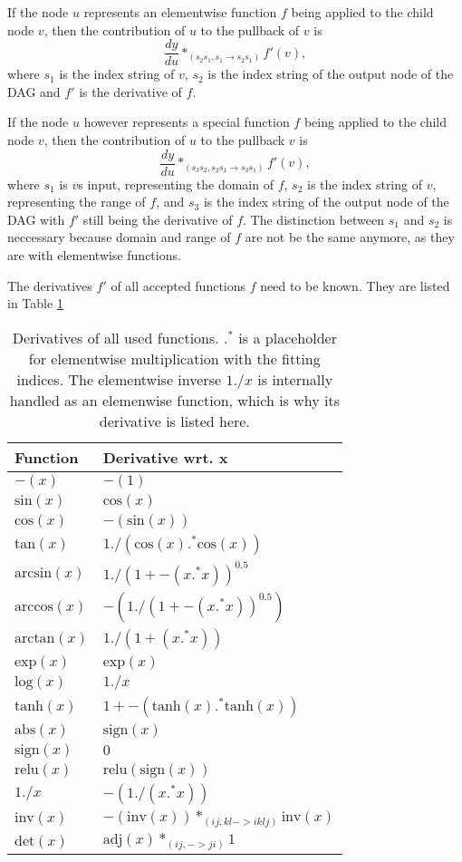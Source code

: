 \documentclass[12pt, a4paper]{report}
\begin{document}
If the node $u$ represents an elementwise function $f$ being applied to the child node $v$, then the contribution of $u$ to the pullback of $v$ is 
$$
\frac{dy}{du} *_{(s_2s_1,s_1 \rightarrow s_2s_1)} f'(v),
$$
where $s_1$ is the index string of $v$, $s_2$ is the index string of the output node of the DAG and $f'$ is the derivative of $f$.

If the node $u$ however represents a special function $f$ being applied to the child node $v$, then the contribution of $u$ to the pullback $v$ is
$$
\frac{dy}{du} *_{(s_3s_2,s_2s_1 \rightarrow s_3s_1)} f'(v),
$$
where $s_1$ is $v$s input, representing the domain of $f$, $s_2$ is the index string of $v$, representing the range of $f$, and $s_3$ is the index string of the output node of the DAG with $f'$ still being the derivative of $f$.
The distinction between $s_1$ and $s_2$ is neccessary because domain and range of $f$ are not be the same anymore, as they are with elementwise functions.

The derivatives $f'$ of all accepted functions $f$ need to be known.
They are listed in Table \ref{tab:func_diffs}
\begin{table}[ht]
    \centering
    \begin{tabular}{l | l}
        Function & Derivative wrt. x \\\hline
        $-(x)$ & $-(1)$ \\
        $\text{sin}(x)$ & $\text{cos}(x)$ \\
        $\text{cos}(x)$ & $-(\text{sin}(x))$ \\
        $\text{tan}(x)$ & $1 ./ (\text{cos}(x) .^* \text{cos}(x))$ \\
        $\text{arcsin}(x)$ & $1 ./ (1 + -(x .^* x))^{0.5}$ \\
        $\text{arccos}(x)$ & $-(1 ./ (1 + -(x .^* x))^{0.5})$ \\
        $\text{arctan}(x)$ & $1 ./ (1 + (x .^* x))$ \\
        $\text{exp}(x)$ & $\text{exp}(x)$ \\
        $\text{log}(x)$ & $1 ./ x$ \\
        $\text{tanh}(x)$ & $1 + -(\text{tanh}(x) .^* \text{tanh}(x))$ \\
        $\text{abs}(x)$ & $\text{sign}(x)$ \\
        $\text{sign}(x)$ & $0$ \\
        $\text{relu}(x)$ & $\text{relu}(\text{sign}(x))$ \\
        $1 ./ x$ & $- (1 ./ (x .^* x))$ \\
        $\text{inv}(x)$ & $-(\text{inv}(x)) *_{(ij,kl->iklj)} \text{inv}(x)$ \\
        $\text{det}(x)$ & $\text{adj}(x) *_{(ij,->ji)} 1$ \\
    \end{tabular}
    \caption{Derivatives of all used functions. $.^*$ is a placeholder for elementwise multiplication with the fitting indices. The elementwise inverse $1 ./ x$ is internally handled as an elemenwise function, which is why its derivative is listed here.} %
    \label{tab:func_diffs}
\end{table}
\FloatBarrier
\end{document}
